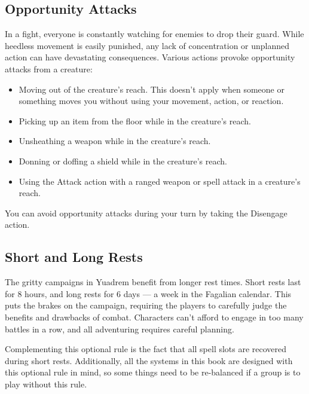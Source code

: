 \subsection*{Opportunity Attacks} \label{rule::opportunityattacks}
    In a fight, everyone is constantly watching for enemies to drop their guard.
    While heedless movement is easily punished, any lack of concentration or unplanned action can have devastating consequences.
    Various actions provoke opportunity attacks from a creature:
    \begin{itemize}
        \item Moving out of the creature's reach.
        This doesn't apply when someone or something moves you without using your movement, action, or reaction.

        \newpage

        \item Picking up an item from the floor while in the creature's reach.
        \item Unsheathing a weapon while in the creature's reach.
        \item Donning or doffing a shield while in the creature's reach.
        \item Using the Attack action with a ranged weapon or spell attack in a creature's reach.
    \end{itemize}
    You can avoid opportunity attacks during your turn by taking the Disengage action.

\subsection*{Short and Long Rests} \label{ssec::shortandlongrests}
    The gritty campaigns in Yuadrem benefit from longer rest times.
    Short rests last for 8 hours, and long rests for 6 days --- a week in the Fagalian calendar.
    This puts the brakes on the campaign, requiring the players to carefully judge the benefits and drawbacks of combat.
    Characters can't afford to engage in too many battles in a row, and all adventuring requires careful planning.

    Complementing this optional rule is the fact that all spell slots are recovered during short rests.
    Additionally, all the systems in this book are designed with this optional rule in mind, so some things need to be re-balanced if a group is to play without this rule.

